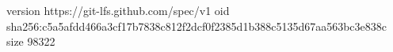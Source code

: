 version https://git-lfs.github.com/spec/v1
oid sha256:c5a5afdd466a3cf17b7838c812f2dcf0f2385d1b388c5135d67aa563bc3e838c
size 98322

